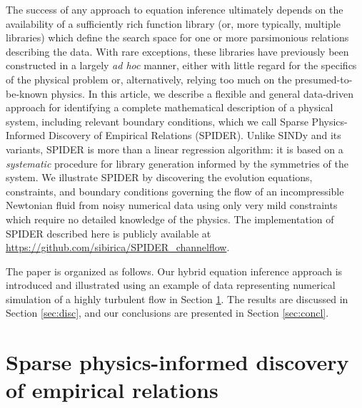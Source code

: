 \documentclass[preprint]{article}
\begin{document}
The success of any approach to equation inference ultimately depends on the availability of a sufficiently rich function library (or, more typically, multiple libraries) which define the search space for one or more parsimonious relations describing the data. With rare exceptions, these libraries have previously been constructed in a largely {\em ad hoc} manner, either with little regard for the specifics of the physical problem or, alternatively, relying too much on the presumed-to-be-known physics. In this article, we describe a flexible and general data-driven approach for identifying a complete mathematical description of a physical system, including relevant boundary conditions, which we call Sparse Physics-Informed Discovery of Empirical Relations (SPIDER). Unlike SINDy and its variants, SPIDER is more than a linear regression algorithm: it is based on a {\it systematic} procedure for library generation informed by the symmetries of the system. 
We illustrate SPIDER by discovering the evolution equations, constraints, and boundary conditions governing the flow of an incompressible Newtonian fluid from noisy numerical data using only very mild constraints which require no detailed knowledge of the physics.
The implementation of SPIDER described here is publicly available at \url{https://github.com/sibirica/SPIDER_channelflow}.

The paper is organized as follows. Our hybrid equation inference approach is introduced and illustrated using an example of data representing numerical simulation of a highly turbulent flow in Section \ref{sec:spider}. The results are discussed in Section \ref{sec:disc}, and our conclusions are presented in Section \ref{sec:concl}.

\section{Sparse physics-informed discovery of empirical relations}
\label{sec:spider}
\end{document}

